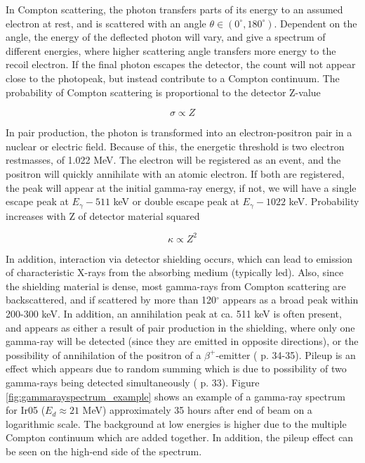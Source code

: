 \noindent In Compton scattering, the photon transfers parts of its energy to an assumed electron at rest, and is scattered with an angle $\theta \in (0^\circ, 180^\circ)$. Dependent on the angle, the energy of the deflected photon will vary, and give a spectrum of different energies, where higher scattering angle transfers more energy to the recoil electron. If the final photon escapes the detector, the count will not appear close to the photopeak, but instead contribute to a Compton continuum. The probability of Compton scattering is proportional to the detector Z-value

\begin{equation}
    \sigma \propto Z
\end{equation}

\noindent 
In pair production, the photon is transformed into an electron-positron pair in a nuclear or electric field. Because of this, the energetic threshold is two electron restmasses, of 1.022 MeV. The electron will be registered as an event, and the positron will quickly annihilate with an atomic electron. If both are registered, the peak will appear at the initial gamma-ray energy, if not, we will have a single escape peak at $E_\gamma-511$ keV or double escape peak at $E_\gamma-1022$ keV. Probability increases with Z of detector material squared 

\begin{equation}
    \kappa\propto Z^2
\end{equation}


In addition, interaction via detector shielding occurs, which can lead to emission of characteristic X-rays from the absorbing medium (typically led). Also, since the shielding material is dense, most gamma-rays from Compton scattering are backscattered, and if scattered by more than 120$^\circ$ appears as a broad peak within 200-300 keV. In addition, an annihilation peak at ca. 511 keV is often present, and appears as either a result of pair production in the shielding, where only one gamma-ray will be detected (since they are emitted in opposite directions), or the possibility of annihilation of the positron of a $\beta^+$-emitter (\cite{Gilmore2008} p. 34-35). Pileup is an effect which appears due to random summing which is due to possibility of two gamma-rays being detected simultaneously (\cite{Gilmore2008} p. 33). Figure \ref{fig:gammarayspectrum_example} shows an example of a gamma-ray spectrum for Ir05 ($E_d\approx 21 $ MeV) approximately 35 hours after end of beam on a logarithmic scale. The background at low energies is higher due to the multiple Compton continuum which are added together. In addition, the pileup effect can be seen on the high-end side of the spectrum. \\


